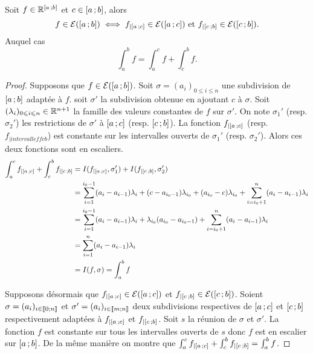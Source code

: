 \begin{prop}
  Soit \(f \in \mathbb{R}^{\left[ a \, ;  b \right]}\) et \(c \in \left[ a \, ;  b \right]\), alors
  \begin{equation}
    f \in \mathcal{E}(\left[ a \, ;  b \right]) \iff f_{|\left[ a \, ;  c \right]} \in \mathcal{E}(\left[ a \, ;  c \right]) \text{~et~} f_{|\left[ c \, ;  b \right]} \in \mathcal{E}(\left[ c \, ;  b \right]).
  \end{equation}
  Auquel cas
  \begin{equation}
    \int_a^b f = \int_a^c f +\int_c^b f.
  \end{equation}
\end{prop}
\begin{proof}
  Supposons que \(f \in \mathcal{E}(\left[ a \, ;  b \right])\). Soit \(\sigma=(a_i)_{0\leqslant i \leqslant n}\) une subdivision de \(\left[ a \, ;  b \right]\) adaptée à \(f\). soit \(\sigma'\) la subdivision obtenue en ajoutant \(c\) à \(\sigma\). Soit \((\lambda_i)_{0 \leqslant i \leqslant n}\in\mathbb{R}^{n+1}\) la famille des valeurs constantes de \(f\) sur \(\sigma'\). On note \(\sigma_1'\) (resp. \(\sigma_2'\)) les restrictions de \(\sigma'\) à \(\left[ a \, ;  c \right]\) (resp. \(\left[ c \, ;  b \right]\)). La fonction \(f_{|\left[ a \, ;  c \right]}\) (resp. \(f_{|intervalleff{c}{b}}\)) est constante sur les intervalles ouverts de \(\sigma_1'\) (resp. \(\sigma_2'\)). Alors ces deux fonctions sont en escaliers.
  \begin{align}
    \int_a^c f_{|\left[ a \, ;  c \right]} +\int_c^b f_{|\left[ c \, ;  b \right]} &= I(f_{|\left[ a \, ;  c \right]},\sigma_1')+I(f_{|\left[ c \, ;  b \right]},\sigma_2') \\
&=\sum_{i=1}^{i_0-1} (a_i-a_{i-1})\lambda_i + (c-a_{i_0-1})\lambda_{i_0} + (a_{i_0}-c)\lambda_{i_0} + \sum_{i=i_0+1}^{n} (a_i-a_{i-1})\lambda_i \\
&= \sum_{i=1}^{i_0-1} (a_i-a_{i-1})\lambda_i + \lambda_{i_0}(a_{i_0}-a_{i_0-1}) +\sum_{i=i_0+1}^{n} (a_i-a_{i-1})\lambda_i\\
&=\sum_{i=1}^{n} (a_i-a_{i-1})\lambda_i\\
&=I(f,\sigma)=\int_a^bf
  \end{align}

  Supposons désormais que \(f_{|\left[ a \, ;  c \right]} \in \mathcal{E}(\left[ a \, ;  c \right])\) et \( f_{|\left[ c \, ;  b \right]} \in \mathcal{E}(\left[ c \, ;  b \right])\). Soient \(\sigma=(a_i)_{i \in \mathopen{\llbracket}0\mathclose{}\mathpunct{};n\mathclose{\rrbracket}}\) et \(\sigma'=(a_i)_{i \in \mathopen{\llbracket}m\mathclose{}\mathpunct{};n\mathclose{\rrbracket}}\) deux subdivisions respectives de \(\left[ a \, ;  c \right]\) et \(\left[ c \, ;  b \right]\) respectivement adaptées à  \(f_{|\left[ a \, ;  c \right]}\) et \( f_{|\left[ c \, ;  b \right]}\). Soit \(s\) la réunion de \(\sigma\) et \(\sigma'\). La fonction \(f\) est constante sur tous les intervalles ouverts de \(s\) donc \(f\) est en escalier sur \(\left[ a \, ;  b \right]\). De la même manière on montre que 
\(\int_a^c f_{|\left[ a \, ;  c \right]} +\int_c^b f_{|\left[ c \, ;  b \right]} = \int_a^b f\).
\end{proof}

